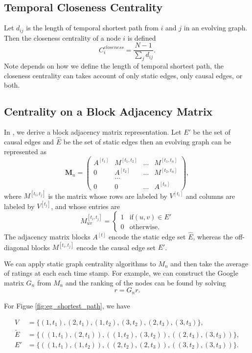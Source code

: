 \documentclass[12pt]{article}
\theoremstyle{definition}
\begin{document}
\subsection{Temporal Closeness Centrality}
\label{sec:temp-clos-centr}

Let $d_{ij}$ is the length of temporal shortest path from $i$ and $j$ in an evolving graph. Then
the closeness centrality of a node $i$ is defined
$$
C_i^{closeness} = \frac{N-1}{\sum_j d_{ij}}.
$$
Note depends on how we define the length of temporal shortest path, the closeness centrality can takes account of only static edges, only causal edges, or both.


\subsection{Centrality on a Block Adjacency Matrix}
\label{sec:centr-block-adjac}

In \cite{chen16}, we derive a block adjacency matrix representation.
Let $E'$ be the set of causal edges and $\hat E$ be the set of static edges then
an evolving graph can be represented as
$$
\bm M_n =
\begin{pmatrix}
A^{[t_1]} & M^{[t_1, t_2]} & \ldots & M^{[t_1, t_n]} \\
0         & A^{[t_2]} & \ldots & M^{[t_2, t_n]} \\
          & \ldots    &        &     \\
0         & 0         & \ldots & A^{[t_n]}
\end{pmatrix},
$$
where $M^{[t_i, t_j]}$ is the matrix whose rows are labeled by $V^{[t_i]}$ and columns are labeled by $V^{[t_j]}$, and whose entries are
$$
  M_{uv}^{[t_i, t_j]} =
  \begin{cases}
    1 & \mbox{if} (u, v) \in E' \\
    0 & \mbox{otherwise}.
  \end{cases}
$$
The adjacency matrix blocks $A^{[t]}$ encode the static edge set $\hat E$, whereas the off-diagonal blocks $M^{[t_i, t_j]}$ encode the causal edge set $E'$.

We can apply static graph centrality algorithms to $M_n$ and then take the average of ratings at each each time stamp. For example, we can construct the Google matrix
$G_n$ from $M_n$ and the ranking of the nodes can be found by solving
$$
 r= G_n r.
$$

For Figue \ref{fig:eg_shortest_path}, we have

\begin{align*}
V & = \{(1,\!t_1), (2,\!t_1), (1,\!t_2), (3,\!t_2), (2,\!t_3), (3,\!t_3)\},\\
\tilde E &= \{((1,\!t_1), (2,\!t_1)), ((1,\!t_2), (3,\!t_2)), ((2,\!t_3), (3,\!t_3))\},\\
E'  &= \{((1,\!t_1), (1,\!t_2)), ((2,\!t_2), (2,\!t_3)), ((3,\!t_2), (3,\!t_3))\}.
\end{align*}
\end{document}
